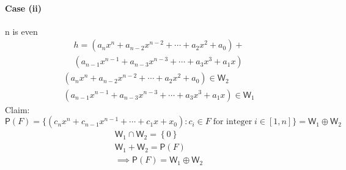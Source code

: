 \documentclass[letterpaper,12pt]{article}
\newcommand{\?}{\stackrel{?}{=}}
\begin{document}
\begin{spacing}{1.5}
\begin{enumerate}
\paragraph{Case (ii)} n is even
\begin{multline}
h = \left(a_nx^n +  a_{n-2}x^{n-2}+\cdots+ a_2x^2 + a_0\right)+ \\
\left(a_{n-1}x^{n-1} + a_{n-3}x^{n-3}+\cdots+ a_3x^3 + a_1x\right)
\end{multline}
\begin{align}
\left(a_nx^n +  a_{n-2}x^{n-2}+\cdots+ a_2x^2 + a_0\right) \in
\mathsf{W}_2\\
\left(a_{n-1}x^{n-1} + a_{n-3}x^{n-3}+\cdots+ a_3x^3 + a_1x\right) \in
\mathsf{W}_1 
\end{align}
Claim: \vspace{-1.5em} \[\mathsf{P}(F) =\big\{\left(c_nx^n + c_{n-1}x^{n-1} + \cdots +
    c_1x + x_0\right) \colon c_i \in F \;\text{for integer}\; i \in
  [1,n]\big\} = \mathsf{W}_1 \oplus \mathsf{W}_2\]
\begin{align}
\mathsf{W}_1\cap\mathsf{W}_2 = \left\{0\right\}\\
\mathsf{W}_1 + \mathsf{W}_2 = \mathsf{P}(F)\\
\implies \mathsf{P}(F) = \mathsf{W}_1 \oplus \mathsf{W}_2
\end{align}
\end{enumerate}
\newpage{}

\end{spacing}
\end{document}
